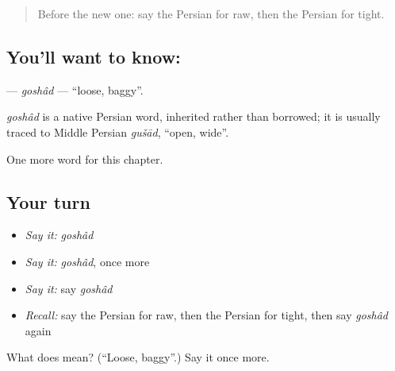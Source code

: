 \begin{quote}
Before the new one: say the Persian for raw, then the Persian for tight.
\end{quote}

\subsection*{You'll want to know: }
\textbf{} — \emph{goshâd} — \textquotedblleft{}loose, baggy\textquotedblright{}.

\begin{cousinweb}
\emph{goshâd} is a native Persian word, inherited rather than borrowed; it is usually traced to Middle Persian \emph{gušād}, \textquotedblleft{}open, wide\textquotedblright{}.
\end{cousinweb}

\begin{grammarlens}[title={What you've built}]
One more word for this chapter.
\end{grammarlens}

\subsection*{Your turn}
\begin{itemize}
\raggedright
  \item \emph{Say it:} \emph{goshâd}
  \item \emph{Say it:} \emph{goshâd}, once more
  \item \emph{Say it:} say \emph{goshâd}
  \item \emph{Recall:} say the Persian for raw, then the Persian for tight, then say \emph{goshâd} again
\end{itemize}

\begin{tcolorbox}[breakable,colback=teal!4,colframe=teal!35!black,title={Before you move on}]
What does  mean? (\textquotedblleft{}Loose, baggy\textquotedblright{}.) Say it once more.
\end{tcolorbox}
